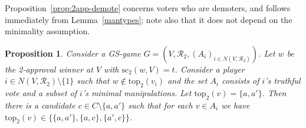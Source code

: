 \documentclass[11pt]{article}
\newtheorem{proposition}{Proposition}
\newcommand{\calR}{\mathcal{R}}
\newcommand{\tp}{\mathrm{top}}
\newcommand{\scr}{\mathrm{sc}}
\begin{document}
\iffalse
\begin{proof}
Since $i$ is a GS-manipulator, he does not rank $w$ first;
therefore, he ranks $w$ second. 
Then the only way for him to improve the outcome 
is to vote so that his top candidate $p = \tp(v_i)$ wins. 
For this $i$ must demote $w$ and promote a candidate $c$ which will not overtake $p$, 
i.e., $i$ is necessarily a demoter.
Moreover, it must be the case that $p$ beats every candidate in $C\setminus\{w\}$ at $V$.
Thus, $i$ can manipulate in favour of  $p = \tp(v_i)$  only if
$S(V, 2)\neq\emptyset$ and $p=p^*(V,2)$, and
%
every non-truthful strategy in $A_i$
is of the form $v_i[w;c]$ %
for some $c\not\in\tp_2(v)$. Thus, 
$p\in \cap_{v\in A_i}\tp_2(v)$, which proves our claim. 
\end{proof}
\fi

Proposition~\ref{prop:2app-demote} 
concerns voters who are demoters, and follows immediately
from Lemma~\ref{mantypes}; note also that it does not depend on the minimality assumption.

\begin{proposition}\label{prop:2app-promote}
Consider a GS-game $G=(V, \calR_2, (A_i)_{i\in N(V, \calR_2)})$.
Let $w$ be the 2-approval winner at $V$ with $\scr_2(w, V)=t$.
Consider a player $i\in N(V, \calR_2)\setminus\{1\}$ 
such that $w\not\in\tp_2(v_i)$ and the set $A_i$ consists of $i$'s truthful vote 
and a subset of $i$'s minimal manipulations.
Let $\tp_2(v) = \{a, a'\}$.
Then there is a candidate $c\in C\setminus\{a, a'\}$
such that for each $v\in A_i$ we have $\tp_2(v)\in\{\{a, a'\}, \{a, c\}, \{a',c\}\}$. 
\end{proposition}
\end{document}
